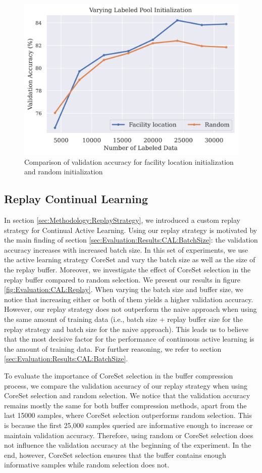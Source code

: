 \begin{figure}[h]
    \centering
    \includegraphics[width=0.6\linewidth]{images/results_CAL/Facility_location_init.png}
    \caption{Comparison of validation accuracy for facility location initialization and random initialization}
    \label{fig:Evaluation:CAL:FLinit}
\end{figure}


\subsection{Replay Continual Learning}
\label{sec:Evaluation:CAL:Replay}
In section \ref{sec:Methodology:ReplayStrategy}, we introduced a custom replay strategy for Continual Active Learning. Using our replay strategy is motivated by the main
finding of section \ref{sec:Evaluation:Results:CAL:BatchSize}: the validation accuracy increases with increased batch size. In this set of experiments, we use the active
learning strategy CoreSet and vary the batch size as well as the size of the replay buffer. Moreover, we investigate the effect of CoreSet selection in the replay buffer
compared to random selection. We present our results in figure \ref{fig:Evaluation:CAL:Replay}. When varying the batch size and buffer size, we notice that increasing either
or both of them yields a higher validation accuracy. However, our replay strategy does not outperform the naive approach when using the same amount of training data
(i.e., batch size + replay buffer size for the replay strategy and batch size for the naive approach). This leads us to believe that the most decisive factor for the performance
of continuous active learning is the amount of training data. For further reasoning, we refer to section \ref{sec:Evaluation:Results:CAL:BatchSize}. \par
To evaluate the importance of CoreSet selection in the buffer compression process, we compare the validation accuracy of our replay strategy when using CoreSet selection and
random selection. We notice that the validation accuracy remains mostly the same for both buffer compression methods, apart from the last 15000 samples, where CoreSet selection
outperforms random selection. This is because the first 25,000 samples queried are informative enough to increase or maintain validation accuracy. Therefore, using random or
CoreSet selection does not influence the validation accuracy at the beginning of the experiment. In the end, however, CoreSet selection ensures that the buffer contains
enough informative samples while random selection does not. \par


